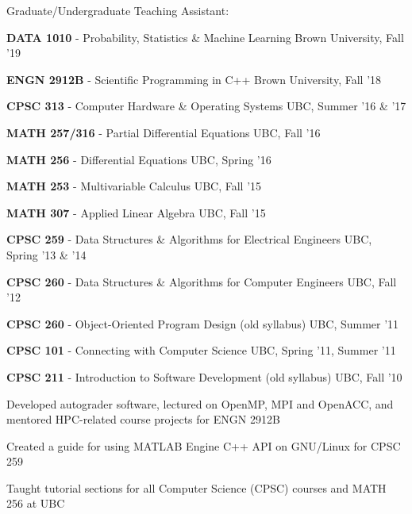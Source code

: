\documentclass[margin,line]{res}
\newenvironment{list1}{
  \begin{list}{\ding{113}}{
      \setlength{\itemsep}{0in}
      \setlength{\parsep}{0in} \setlength{\parskip}{0in}
      \setlength{\topsep}{0in} \setlength{\partopsep}{0in}
      \setlength{\leftmargin}{0.17in}}}{\end{list}}
\newenvironment{list3}{
  \begin{list}{\textopenbullet}{
      \setlength{\itemsep}{0in}
      \setlength{\parsep}{0in} \setlength{\parskip}{0in}
      \setlength{\topsep}{0in} \setlength{\partopsep}{0in}
      \setlength{\leftmargin}{0.1in}}}{\end{list}}
\begin{document}
\begin{resume}

Graduate/Undergraduate Teaching Assistant:
\vspace*{.2cm}

\begin{list1}
\setlength\itemsep{0.25em}
\item[] {\bf DATA 1010} - Probability, Statistics \& Machine Learning \hfill Brown University, Fall '19
\item[] {\bf ENGN 2912B} - Scientific Programming in C++ \hfill Brown University, Fall '18
\item[] {\bf CPSC 313} - Computer Hardware \& Operating Systems \hfill UBC, Summer '16 \& '17
\item[] {\bf MATH 257/316} - Partial Differential Equations \hfill UBC, Fall '16
\item[] {\bf MATH 256} - Differential Equations \hfill UBC, Spring '16
\item[] {\bf MATH 253} - Multivariable Calculus \hfill UBC, Fall '15
\item[] {\bf MATH 307} - Applied Linear Algebra \hfill UBC, Fall '15
\item[] {\bf CPSC 259} - Data Structures \& Algorithms for Electrical Engineers \hfill UBC, Spring '13 \& '14
\item[] {\bf CPSC 260} - Data Structures \& Algorithms for Computer Engineers \hfill UBC, Fall '12
\item[] {\bf CPSC 260} - Object-Oriented Program Design (old syllabus) \hfill UBC, Summer '11
\item[] {\bf CPSC 101} - Connecting with Computer Science \hfill UBC, Spring '11, Summer '11
\item[] {\bf CPSC 211} - Introduction to Software Development (old syllabus) \hfill UBC, Fall '10\\
\begin{list3}
\vspace*{-.05cm}
\setlength\itemsep{0.25em}
\item Developed autograder software, lectured on OpenMP, MPI and OpenACC, and mentored HPC-related course projects for ENGN 2912B
\item Created a guide for using MATLAB Engine C++ API on GNU/Linux for CPSC 259
\item Taught tutorial sections for all Computer Science (CPSC) courses and MATH 256 at UBC
\end{list3}
\end{list1}


\end{resume}
\end{document}
